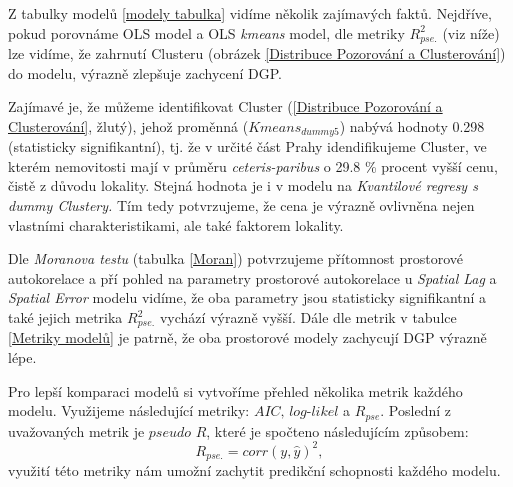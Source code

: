 \documentclass[11pt, a4paper]{article}
\begin{document}
\clearpage

Z tabulky modelů \ref{modely tabulka} vidíme několik zajímavých faktů. Nejdříve, pokud porovnáme OLS model a OLS \textit{kmeans} model, dle metriky \textit{$R_{pse.}^{2}$} (viz níže) lze vidíme, že zahrnutí Clusteru (obrázek \ref{Distribuce Pozorování a Clusterování}) do modelu, výrazně zlepšuje zachycení DGP. 

Zajímavé je, že můžeme identifikovat Cluster (\ref{Distribuce Pozorování a Clusterování}, žlutý), jehož proměnná (\textit{$Kmeans_{dummy5}$}) nabývá hodnoty 0.298 (statisticky signifikantní), tj. že v určité část Prahy idendifikujeme Cluster, ve kterém nemovitosti mají v průměru \textit{ceteris-paribus} o 29.8 \% procent vyšší cenu, čistě z důvodu lokality. Stejná hodnota je i v modelu na \textit{Kvantilové regresy s dummy Clustery.} Tím tedy potvrzujeme, že cena je výrazně ovlivněna nejen vlastními charakteristikami, ale také faktorem lokality.

Dle \textit{Moranova testu} (tabulka \ref{Moran}) potvrzujeme přítomnost prostorové autokorelace a pří pohled na parametry prostorové autokorelace u \textit{Spatial Lag} a \textit{Spatial Error} modelu vidíme, že oba parametry jsou statisticky signifikantní a také jejich metrika \textit{$R_{pse.}^{2}$} vychází výrazně vyšší. Dále dle metrik v tabulce \ref{Metriky modelů} je patrně, že oba prostorové modely zachycují DGP výrazně lépe.

Pro lepší komparaci modelů si vytvoříme přehled několika metrik každého modelu. Využijeme následující metriky: $\textit{AIC, log-likel}$ a $R_{pse}$. Poslední z uvažovaných metrik je $\textit{pseudo R}$, které je spočteno následujícím způsobem:
  $$R_{pse.} = corr(y, \hat y)^2,$$
  využití této metriky nám umožní zachytit predikční schopnosti každého modelu.

\begin{table}[!htbp] \centering 
\caption{Metriky modelů} 
\label{Metriky modelů} 
\end{table} 
\end{document}
